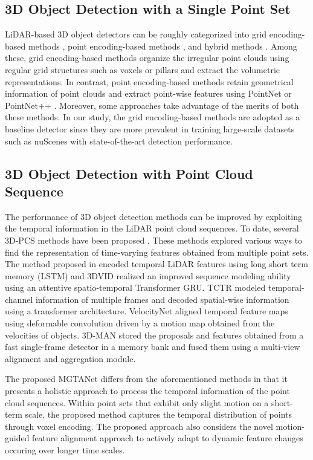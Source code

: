 \documentclass[letterpaper]{article} \usepackage{aaai23}  \usepackage{times}  \usepackage{helvet}  \usepackage{courier}  \usepackage[hyphens]{url}  \usepackage{graphicx} \urlstyle{rm} \def\UrlFont{\rm}  \usepackage{natbib}  \usepackage{caption} \frenchspacing  \setlength{\pdfpagewidth}{8.5in} \usepackage{algorithm}
\begin{document}
\subsection{3D Object Detection with a Single Point Set}
LiDAR-based 3D object detectors can be roughly categorized into  grid encoding-based methods \cite{second, voxelnet, pointpillars, voxelrcnn}, point encoding-based methods \cite{pointrcnn, 3dssd, pointgnn},  and hybrid methods \cite{fastpointrcnn, STD, pvrcnn, sa-ssd}. Among these, grid encoding-based methods organize the irregular point clouds using  regular grid structures such as voxels \cite{voxelnet} or pillars \cite{pointpillars} and  extract  the volumetric representations.  
In contrast, point encoding-based methods retain geometrical information of point clouds and extract point-wise features using PointNet \cite{pointnet} or PointNet++ \cite{pointnet++}. 
Moreover, some approaches take advantage of the merits of both these methods. 
In our study, the grid encoding-based methods are adopted as a baseline detector since they are more prevalent in training large-scale datasets such as nuScenes with state-of-the-art detection performance.


\subsection{3D Object Detection with Point Cloud Sequence}
The performance of 3D object detection methods can be improved by exploiting the temporal information in the LiDAR point cloud sequences. To date, several 3D-PCS methods have been proposed \cite{3dvodlstm, 3dvid, tctr, velocitynet, 3dman}. These methods explored various ways to find the representation of time-varying features obtained from multiple point sets. The method proposed in \cite{3dvodlstm} encoded temporal LiDAR features using long short term memory (LSTM) and 3DVID \cite{3dvid} realized an improved sequence modeling ability using an attentive spatio-temporal Transformer GRU. 
TCTR \cite{tctr} modeled temporal-channel information of multiple frames and decoded spatial-wise information using a transformer architecture. VelocityNet \cite{velocitynet} aligned temporal feature maps using deformable convolution driven by a motion map obtained from the velocities of objects. 3D-MAN \cite{3dman} stored the proposals and features obtained from a fast single-frame detector in a memory bank and fused them using a multi-view alignment and aggregation module.  


The proposed MGTANet differs from the aforementioned methods in that it presents a holistic approach to process the temporal information of the point cloud sequences. Within point sets that exhibit only slight motion on a short-term scale, the proposed method captures the temporal distribution of points through voxel encoding. 
The proposed approach also considers the novel motion-guided feature alignment approach to actively adapt to dynamic feature changes occuring over longer time scales.
\end{document}
